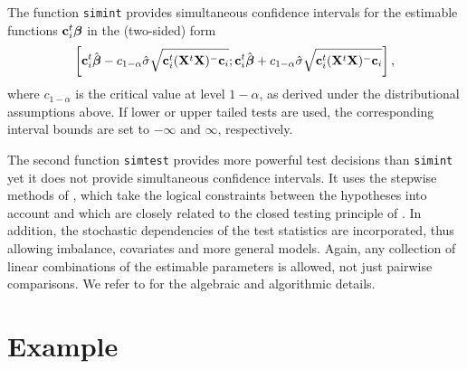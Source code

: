 \documentclass{article}
\newcommand{\bbeta}{\mbox{\boldmath $\beta$}}
\newcommand{\bc}{{\mathbf{c}}}
\newcommand{\bX}{{\mathbf{X}}}
\begin{document}
The function \texttt{simint} provides simultaneous confidence
intervals for the estimable functions $\bc_i^t \bbeta$ in the
(two-sided) form
$$
\left[ \bc_i^t \hat{\bbeta}-c_{1-\alpha}\hat{\sigma}\sqrt{\bc_i^t(\bX^t
\bX)^-\bc_i};
\bc_i^t \hat{\bbeta}+c_{1-\alpha}\hat{\sigma}\sqrt{\bc_i^t(\bX^t
\bX)^-\bc_i} \right],
$$
where $c_{1-\alpha}$ is the critical value at level $1-\alpha$, as
derived under the distributional assumptions above. If lower or
upper tailed tests are used, the corresponding interval bounds are
set to $-\infty$ and $\infty$, respectively.

The second function \texttt{simtest} provides more powerful test
decisions than \texttt{simint} yet it does not provide
simultaneous confidence intervals. It uses the stepwise methods of
\cite{westfall:1997}, which take the logical constraints between the
hypotheses into account and which are closely related to the
closed testing principle of \cite{Marcusetal:1976}. In addition, the
stochastic dependencies of the test statistics are incorporated,
thus allowing imbalance, covariates and more general models.
Again, any collection of linear combinations of the estimable
parameters is allowed, not just pairwise comparisons. We refer to
\cite{westfall:1997} for the algebraic and algorithmic details.

\section{Example}
\end{document}
